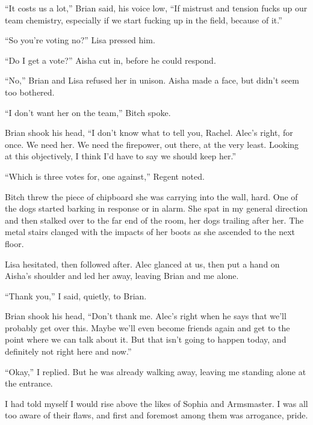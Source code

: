 ``It costs us a lot,'' Brian said, his voice low, ``If mistrust and tension fucks up our team chemistry, especially if we start fucking up in the field, because of it.''



``So you're voting no?'' Lisa pressed him.



``Do I get a vote?'' Aisha cut in, before he could respond.



``No,'' Brian and Lisa refused her in unison.  Aisha made a face, but didn't seem too bothered.



``I don't want her on the team,'' Bitch spoke.



Brian shook his head, ``I don't know what to tell you, Rachel.  Alec's right, for once.  We need her.  We need the firepower, out there, at the very least.  Looking at this objectively, I think I'd have to say we should keep her.''



``Which is three votes for, one against,'' Regent noted.



Bitch threw the piece of chipboard she was carrying into the wall, hard.  One of the dogs started barking in response or in alarm.  She spat in my general direction and then stalked over to the far end of the room, her dogs trailing after her.  The metal stairs clanged with the impacts of her boots as she ascended to the next floor.



Lisa hesitated, then followed after.  Alec glanced at us, then put a hand on Aisha's shoulder and led her away, leaving Brian and me alone.



``Thank you,'' I said, quietly, to Brian.



Brian shook his head, ``Don't thank me.  Alec's right when he says that we'll probably get over this.  Maybe we'll even become friends again and get to the point where we can talk about it.  But that isn't going to happen today, and definitely not right here and now.''



``Okay,'' I replied.  But he was already walking away, leaving me standing alone at the entrance.



I had told myself I would rise above the likes of Sophia and Armsmaster.  I was all too aware of their flaws, and first and foremost among them was arrogance, pride.



